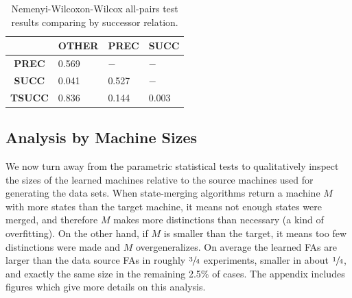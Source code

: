 \documentclass[twoside,11pt]{article}
\newcommand{\ttt}[1]{\texttt{#1}}
\newcommand{\tbf}[1]{\textbf{#1}}
\newcommand{\tttx}[1]{\ttt{#1}\xspace}
\newcommand{\Alpha}{\tttx{Alph}}
\begin{document}
\begin{table}[ht]
    \centering
    \begin{tabular}{clll}
    \toprule
                & \tbf{OTHER} & \tbf{PREC} & \tbf{SUCC} \\
    \midrule
    \tbf{PREC}  & 0.569       & $-$        & $-$        \\
    \tbf{SUCC}  & 0.041       & 0.527      & $-$        \\
    \tbf{TSUCC} & 0.836       & 0.144      & 0.003      \\
    \bottomrule
    \end{tabular}
    \caption{Nemenyi-Wilcoxon-Wilcox all-pairs test results comparing by successor relation.}
    \label{tab:successor-nww}
\end{table}



\subsection{Analysis by Machine Sizes}

We now turn away from the parametric statistical tests to qualitatively inspect the sizes of the learned machines relative to the source machines used for generating the data sets. 
When state-merging algorithms return a machine $M$ with more states than the target machine, it means not enough states were merged, and therefore $M$ makes more distinctions than necessary (a kind of overfitting). 
On the other hand, if $M$ is smaller than the target, it means too few distinctions were made and $M$ overgeneralizes. 
On average the learned FAs are larger than the data source FAs in roughly $\sfrac{3}{4}$ experiments, smaller in about $\sfrac{1}{4}$, and exactly the same size in the remaining 2.5\% of cases. The appendix includes figures which give more details on this analysis.
\end{document}
